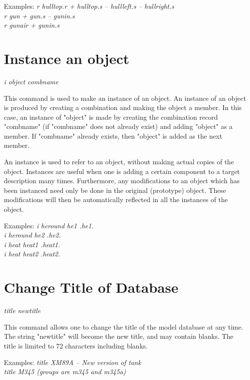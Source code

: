 Examples:
{\em
             r hulltop.r + hulltop.s -- hullleft.s -- hullright.s \\
             r gun + gun.s -- gunin.s \\
             r gunair + gunin.s \\
}

\section{Instance an object}

{\em \center
i object combname
}

This command is used to make an instance of an object.
An instance of an object is produced by creating a combination
and making the object a member.
In this case, an instance of "object" is made by
creating the combination record "combname" (if "combname" does not
already exist) and adding "object" as a member.
If "combname" already exists, then "object" is added as the next member.

An instance is used to refer to an object, without making actual copies
of the object.  Instances are useful when one is adding a certain
component to a target description many times.
Furthermore, any modifications to an object which has been instanced need only be
done in the original (prototype) object.
These modifications will then be automatically reflected in all the
instances of the object.

Examples:
{\em
                i heround he1 .he1. \\
                i heround he2 .he2. \\
                i heat heat1 .heat1. \\
                i heat heat2 .heat2. \\
}

\section{Change Title of Database}

{\em \center
title newtitle
}

This command allows one to change the title of the model database at any time.
The string "newtitle" will become the new title, and may contain blanks.
The title is limited to 72 characters including blanks.

Examples:
{\em
          title XM89A -- New version of tank \\
          title M345 (groups are m345 and m345a) \\
}

